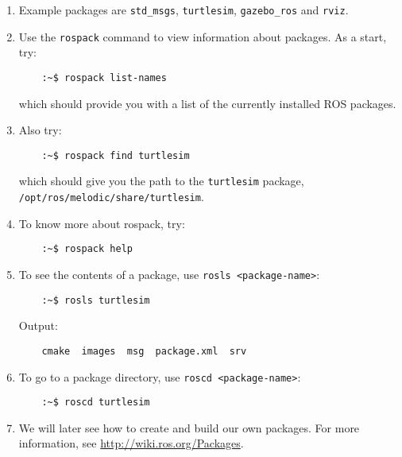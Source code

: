 \documentclass{article}
\begin{document}
\begin{enumerate}
                \item Example packages are \texttt{std\_msgs}, \texttt{turtlesim}, \texttt{gazebo\_ros} and \texttt{rviz}.
                \item Use the \texttt{rospack} command to view information about packages. As a start, try:
                \begin{verbatim}
    :~$ rospack list-names
                \end{verbatim}
                which should provide you with a list of the currently installed ROS packages.
                \item Also try:
                \begin{verbatim}
    :~$ rospack find turtlesim
                \end{verbatim}
                which should give you the path to the \texttt{turtlesim} package, \texttt{/opt/ros/melodic/share/turtlesim}.
                \item To know more about rospack, try:
                \begin{verbatim}
    :~$ rospack help
                \end{verbatim}
                \item To see the contents of a package, use \texttt{rosls <package-name>}:
                \begin{verbatim}
    :~$ rosls turtlesim
                \end{verbatim}
                Output:
                \begin{verbatim}
    cmake  images  msg  package.xml  srv
                \end{verbatim}
                \item To go to a package directory, use \texttt{roscd <package-name>}:
                \begin{verbatim}
    :~$ roscd turtlesim
                \end{verbatim}
                \item We will later see how to create and build our own packages. For more information, see \url{http://wiki.ros.org/Packages}.
            \end{enumerate}
\end{document}

